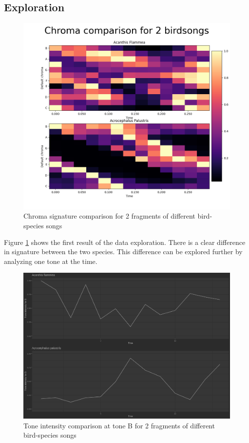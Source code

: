 \documentclass[
]{article}
\begin{document}
\hypertarget{exploration}{%
\subsection{Exploration}\label{exploration}}

\begin{figure}
\centering\includegraphics[width=\linewidth]{../figures/chroma_comparison.png}
\caption{Chroma signature comparison for 2 fragments of different bird-species songs}
\label{fig:fig3}
\end{figure}

Figure \ref{fig:fig3} shows the first result of the data exploration.
There is a clear difference in signature between the two species. This
difference can be explored further by analyzing one tone at the time.

\newpage

\begin{figure}
\centering\includegraphics[width=\linewidth]{../figures/B_comparison.png}
\caption{Tone intensity comparison at tone B for 2 fragments of different bird-species songs}
\label{fig:fig4}
\end{figure}
\end{document}
